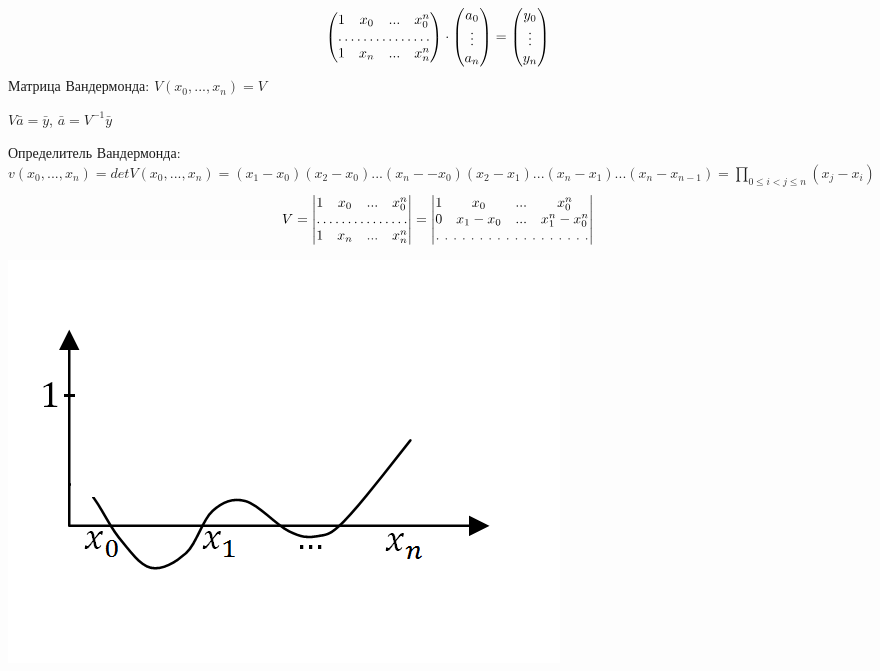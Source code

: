 \documentclass[12pt]{article}
\theoremstyle{definition}
\numberwithin{equation}{section}
\begin{document}
\[\begin{pmatrix}
1 & x_0 & ... & x_0^n \\
\hdotsfor[1]{4} \\
1 & x_n & ... & x_n^n
\end{pmatrix} \cdot \begin{pmatrix}
a_0 \\
\vdots\\
a_n
\end{pmatrix} = \begin{pmatrix}
y_0 \\
\vdots\\
y_n
\end{pmatrix}\]
Матрица Вандермонда: $V(x_0,...,x_n)=V$ 
\begin{center}$V \bar a = \bar y$, $\bar a=V^{-1} \bar y$\end{center}
Определитель Вандермонда: $v(x_0,...,x_n) = det V(x_0,...,x_n) = (x_1-x_0)(x_2-x_0)...(x_n--x_0)(x_2-x_1)...(x_n-x_1)...(x_n-x_{n-1}) = \prod\limits_{0 \leq i < j \leq n} (x_j-x_i)$ 
\[ V = \begin{vmatrix}
1 & x_0 & ... & x_0^n \\
\hdotsfor[1]{4} \\
1 & x_n & ... & x_n^n
\end{vmatrix} = \begin{vmatrix}
1 & x_0 & ... & x_0^n \\
0 & x_1-x_0 & ... & x_1^n-x_0^n \\
\hdotsfor[2]{4} 
\end{vmatrix}\]
\begin{center}
\includegraphics[scale=0.5]{l3_1.png}
\end{center}
\end{document}
